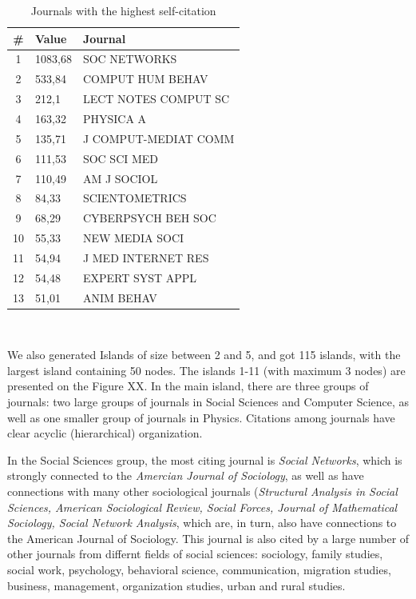 \documentclass[11pt]{article} %
\begin{document}
\begin{table}
\caption{Journals with the highest self-citation} \label{jselfcite}\medskip
\renewcommand{\arraystretch}{0.95}
\small
\begin{center}
\begin{tabular}{c|l|l} 
\# &	Value&	Journal  \\  \hline 
1&	1083,68&	SOC NETWORKS\\
2&	533,84&	COMPUT HUM BEHAV \\
3&	212,1&	LECT NOTES COMPUT SC \\
4&	163,32&	PHYSICA A\\
5&	135,71&	J COMPUT-MEDIAT COMM\\
6&	111,53&	SOC SCI MED\\
7&	110,49&	AM J SOCIOL\\
8&	84,33&	SCIENTOMETRICS\\
9&	68,29&	CYBERPSYCH BEH SOC \\
10&	55,33&	NEW MEDIA SOCI\\
11&	54,94&	J MED INTERNET RES\\
12&	54,48&	EXPERT SYST APPL\\
13&	51,01&	ANIM BEHAV\\ \hline 
\end{tabular} \\ 
\end{center}
\end{table}  

We also generated Islands of size between 2 and 5, and got 115 islands, with the largest island containing 50 nodes. The islands 1-11 (with maximum 3 nodes) are presented on the Figure XX. In the main island, there are three groups of journals: two large groups of journals in Social Sciences and Computer Science, as well as one smaller group of journals in Physics. Citations among journals have clear acyclic (hierarchical) organization. \medskip 

In the Social Sciences group, the most citing journal is \textit{Social Networks}, which is strongly connected to the \textit{Amercian Journal of Sociology}, as well as have connections with many other sociological journals (\textit{Structural Analysis in Social Sciences, American Sociological Review, Social Forces, Journal of Mathematical Sociology, Social Network Analysis}, which are, in turn, also have connections to the American Journal of Sociology. This journal is also cited by a large number of other journals from differnt fields of social sciences: sociology, family studies, social work, psychology, behavioral science, communication, migration studies, business, management, organization studies, urban and rural studies. \medskip 
\end{document}
